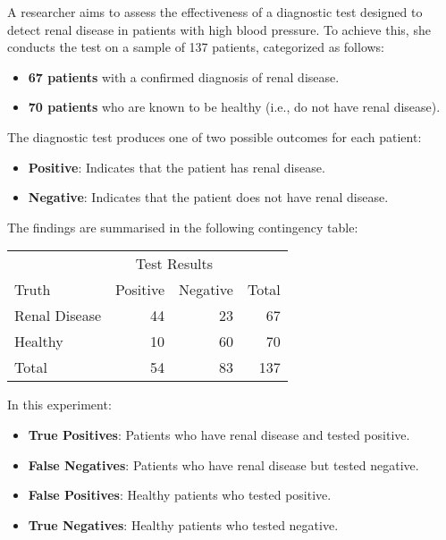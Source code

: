 \begin{example}
    A researcher aims to assess the effectiveness of a diagnostic test designed to detect renal disease in patients with high blood pressure. To achieve this, she conducts the test on a sample of 137 patients, categorized as follows:

\begin{itemize}
    \item \textbf{67 patients} with a confirmed diagnosis of renal disease.
    \item \textbf{70 patients} who are known to be healthy (i.e., do not have renal disease).
\end{itemize}

The diagnostic test produces one of two possible outcomes for each patient:

\begin{itemize}
    \item \textbf{Positive}: Indicates that the patient has renal disease.
    \item \textbf{Negative}: Indicates that the patient does not have renal disease.
\end{itemize}

The findings are summarised in the following contingency table:

    \begin{tabular}{lrrr} 
        & \multicolumn{2}{c}{ Test Results } & \\
        Truth & Positive & Negative & Total \\
        Renal Disease & 44 & 23 & 67 \\
        Healthy & 10 & 60 & 70 \\
        Total & 54 & 83 & 137
        \end{tabular}
        
    In this experiment:


        \begin{itemize}
            \item \textbf{True Positives}: Patients who have renal disease and tested positive.
            \item \textbf{False Negatives}: Patients who have renal disease but tested negative.
            \item \textbf{False Positives}: Healthy patients who tested positive.
            \item \textbf{True Negatives}: Healthy patients who tested negative.
        \end{itemize}
    

\end{example}
